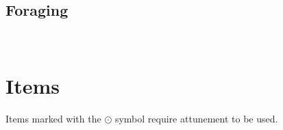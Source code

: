     \subsection*{Foraging} \label{ssec::foraging}

\newpage~\newpage

\section{Items} \label{sec::items}
    Items marked with the $\odot$ symbol require attunement to be used.

    
    

